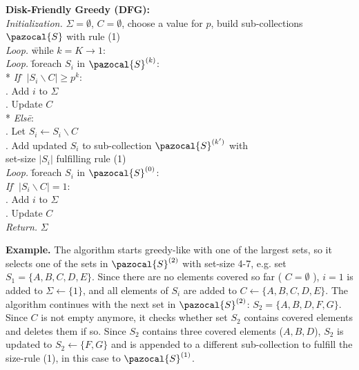 \documentclass[a4paper]{article}
\newcommand{\Sa}{\pazocal{S}}
\begin{document}
\begin{tabbing}
\textbf{Disk-Friendly Greedy (DFG):}\cite{Cormode} \\
\textit{Initialization.} $\Sigma = \emptyset$, $C = \emptyset$, choose a value for $p$, build sub-collections $\Sa$ with rule (1) \\
\textit{Loop.}  \= while $k = K \xrightarrow{} 1$: \\
                \> \textit{Loop.}   \= foreach $S_i$ in $\Sa^{(k)}$: \\
                \>                  \>* \textit{If} \= $|S_i \backslash C| \geq p^k$: \\
                \>                  \>              . Add $i$ to $\Sigma$ \\
                \>                  \>              . Update $C$ \\
                \>                  \>* \textit{Els\=e}: \\
                \>                  \>              . Let $S_i \xleftarrow{} S_i \backslash C$ \\
                \>                  \>              . Add updated $S_i$ to sub-collection $\Sa^{(k')}$ with \\
                \>                  \>              \> set-size $|S_i|$ fulfilling rule (1) \\
\textit{Loop.}  \= foreach $S_i$ in $\Sa^{(0)}$: \\
                \> \textit{If}  \= $|S_i \backslash C| = 1$: \\
                \>              . Add $i$ to $\Sigma$ \\
                \>              . Update $C$ \\

\textit{Return.} $\Sigma$
\end{tabbing}

\textbf{Example.} The algorithm starts greedy-like with one of the largest sets, so it selects one of the sets in $\Sa^{(2)}$ with set-size 4-7, e.g. set $S_1 = \{A,B,C,D,E\}$. Since there are no elements covered so far ( $C = \emptyset$ ), $i=1$ is added to $\Sigma \xleftarrow{} \{1\}$, and all elements of $S_i$ are added to $C \xleftarrow{}\{A,B,C,D,E\}$. 
The algorithm continues with the next set in $\Sa^{(2)}$: $S_2 = \{A,B,D,F,G\}$. Since $C$ is not empty anymore, it checks whether set $S_2$ contains covered elements and deletes them if so. Since $S_2$ contains three covered elements ($A,B,D$), $S_2$ is updated to $S_2 \xleftarrow{} \{ F,G\}$ and is appended to a different sub-collection to fulfill the size-rule (1), in this case to $\Sa^{(1)}$. 
\end{document}
